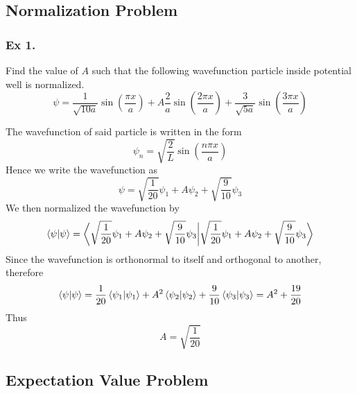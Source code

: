 \documentclass[../../../main.tex]{subfiles}
\begin{document}
\subsection*{Normalization Problem}
\subsubsection*{Ex 1.} Find the value of $A$ such that the following wavefunction particle inside potential well is normalized.
\begin{equation*}
    \psi=\frac{1}{\sqrt{10a}}\sin \left(\frac{\pi x}{a}\right) + A\frac{2}{a}\sin \left(\frac{2\pi x}{a}\right) + \frac{3}{\sqrt{5a}}\sin \left(\frac{3\pi x}{a}\right)
\end{equation*}

The wavefunction of said particle is written in the form 
\begin{equation*}
    \psi_n=\sqrt{\frac{2}{L}}\sin\left(\frac{n\pi x}{a}\right)
\end{equation*}
Hence we write the wavefunction as 
\begin{equation*}
    \psi=\sqrt{\frac{1}{20}}\psi_1+A\psi_2 + \sqrt{\frac{9}{10}}\psi_3
\end{equation*}
We then normalized the wavefunction by 
\begin{equation*}
    \braket{\psi|\psi}=\bigg\langle {\sqrt{\frac{1}{20}}\psi_1+A\psi_2 + \sqrt{\frac{9}{10}}\psi_3\bigg|\sqrt{\frac{1}{20}}\psi_1+A\psi_2 + \sqrt{\frac{9}{10}}\psi_3}\bigg\rangle
\end{equation*}
Since the wavefunction is orthonormal to itself and orthogonal to another, therefore 
\begin{equation*}
    \braket{\psi|\psi}=\frac{1}{20}\braket{\psi_1|\psi_1}+ A^2\braket{\psi_2|\psi_2} + \frac{9}{10}\braket{\psi_3|\psi_3}= A^2+\frac{19}{20}
\end{equation*}
Thus 
\begin{equation*}
    A=\sqrt{\frac{1}{20}}
\end{equation*}

\subsection*{Expectation Value Problem}
\end{document}

